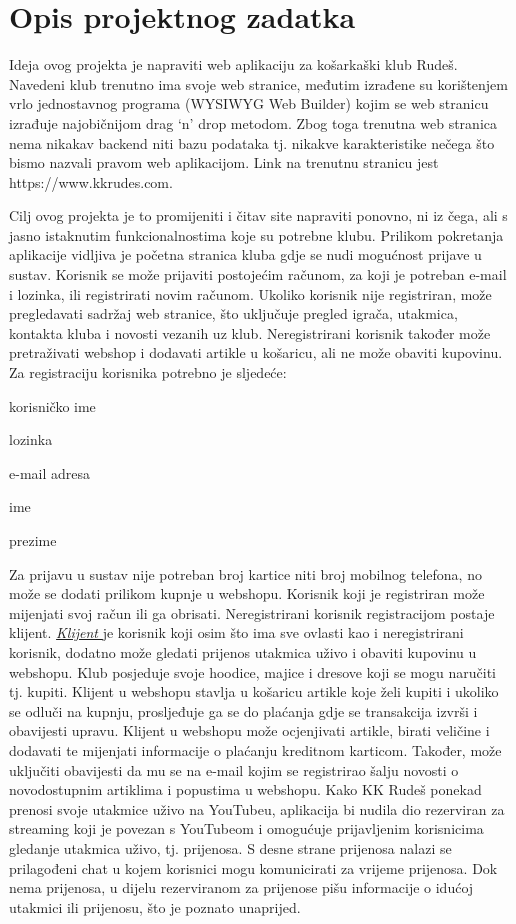 \chapter{Opis projektnog zadatka}
		
	
		\textnormal{Ideja ovog projekta je napraviti web aplikaciju za košarkaški klub Rudeš. Navedeni klub trenutno ima svoje web stranice, međutim izrađene su korištenjem vrlo jednostavnog programa (WYSIWYG Web Builder) kojim se web stranicu izrađuje najobičnijom drag ‘n’ drop metodom. Zbog toga trenutna web stranica nema nikakav backend niti bazu podataka tj. nikakve karakteristike nečega što bismo nazvali pravom web aplikacijom. Link na trenutnu stranicu jest https://www.kkrudes.com.
		}
	
		\textnormal{Cilj ovog projekta je to promijeniti i čitav site napraviti ponovno, ni iz čega, ali s jasno istaknutim funkcionalnostima koje su potrebne klubu.
		Prilikom pokretanja aplikacije vidljiva je početna stranica kluba gdje se nudi mogućnost prijave u sustav. Korisnik se može prijaviti postojećim računom, za koji je potreban e-mail i lozinka, ili registrirati novim računom. Ukoliko korisnik nije registriran, može pregledavati sadržaj web stranice, što uključuje pregled igrača, utakmica, kontakta kluba i novosti vezanih uz klub. Neregistrirani korisnik također može pretraživati webshop i dodavati artikle u košaricu, ali ne može obaviti kupovinu. Za registraciju korisnika potrebno je sljedeće: }
	\begin{packed_item}
		\item korisničko ime
		\item lozinka
		\item e-mail adresa
		\item ime
		\item prezime
	\end{packed_item}
   \textnormal{ Za prijavu u sustav nije potreban broj kartice niti broj mobilnog telefona, no može se dodati prilikom kupnje u webshopu. Korisnik koji je registriran može mijenjati svoj račun ili ga obrisati. Neregistrirani korisnik registracijom postaje klijent.}
\bigbreak
\underline{\textit{Klijent} }\textnormal {je korisnik koji osim što ima sve ovlasti kao i neregistrirani korisnik, dodatno može gledati prijenos utakmica uživo i obaviti kupovinu u webshopu. Klub posjeduje svoje hoodice, majice i dresove koji se mogu naručiti tj. kupiti.
Klijent u webshopu stavlja u košaricu artikle koje želi kupiti i ukoliko se odluči na kupnju, prosljeđuje ga se do plaćanja gdje se transakcija izvrši i obavijesti upravu. 
Klijent u webshopu može ocjenjivati artikle, birati veličine i dodavati te mijenjati informacije o plaćanju kreditnom karticom. Također, može uključiti obavijesti da mu se na e-mail kojim se registrirao šalju novosti o novodostupnim artiklima i popustima u webshopu. Kako KK Rudeš ponekad prenosi svoje utakmice uživo na YouTubeu, aplikacija bi nudila dio rezerviran za streaming koji je povezan s YouTubeom i omogućuje prijavljenim korisnicima gledanje utakmica uživo, tj. prijenosa. S desne strane prijenosa nalazi se prilagođeni chat u kojem korisnici mogu komunicirati za vrijeme prijenosa. Dok nema prijenosa, u dijelu rezerviranom za prijenose pišu informacije o idućoj utakmici ili prijenosu, što je poznato unaprijed.}
